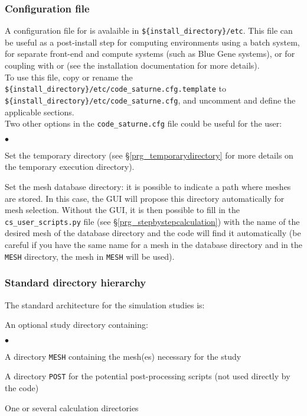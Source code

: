 \subsubsection{Configuration file}
A configuration file for \CS is avalaible in \texttt{\$\{install\_directory\}/etc}. This file can be useful as a post-install step 
for computing environments using a batch system, for separate front-end and compute systems (such as Blue Gene systems), 
or for coupling with  or \CA (see the installation documentation for more details).\\
To use this file, copy or rename the \texttt{\$\{install\_directory\}/etc/code\_saturne.cfg.template} to\\
\texttt{\$\{install\_directory\}/etc/code\_saturne.cfg}, and uncomment and define the applicable sections.\\
Two other options in the \texttt{code\_saturne.cfg} file could be useful for the user:
\begin{list}{$\bullet$}{}
\item Set the temporary directory (see \S\ref{prg_temporarydirectory} for more details on the temporary execution directory).
\item Set the mesh database directory: it is possible to indicate a path where meshes are stored. 
In this case, the GUI will propose this directory automatically for mesh selection. Without the GUI, it is 
then possible to fill in the \texttt{cs\_user\_scripts.py} file (see \S\ref{prg_stepbystepcalculation}) 
with the name of the desired mesh of the database directory and the code will 
find it automatically (be careful if you have the same name for a mesh in the database directory 
and in the \texttt{MESH} directory, the mesh in \texttt{MESH} will be used).
\end{list}

\subsubsection{Standard directory hierarchy}
\label{prg_architecture}%
The standard architecture for the simulation studies is:

\noindent
An optional study directory containing:
\begin{list}{$\bullet$}{}
\item A directory \texttt{MESH} containing the mesh(es)
      necessary for the study
\item A directory \texttt{POST} for the potential post-processing scripts (not
used directly by the code)
\item One or several calculation directories
\end{list}

